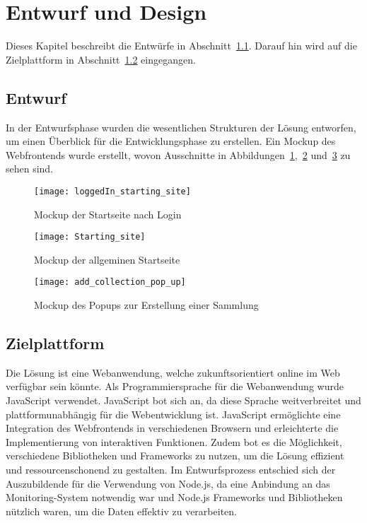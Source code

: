 \section{Entwurf und Design}\label{sec:entwurf-und-design}

Dieses Kapitel beschreibt die Entwürfe in Abschnitt~\ref{subsec:entwurf}.
Darauf hin wird auf die Zielplattform in Abschnitt~\ref{subsec:zielplattform} eingegangen.

\subsection{Entwurf}\label{subsec:entwurf}

In der Entwurfsphase wurden die wesentlichen Strukturen der Lösung entworfen, um einen Überblick für die Entwicklungsphase zu erstellen.
Ein Mockup des Webfrontends wurde erstellt, wovon Ausschnitte in Abbildungen~\ref{fig:mockup1},~\ref{fig:mockup2} und~\ref{fig:mockup3} zu sehen sind.

\begin{figure}[h]
    \centering
    \texttt{[image: loggedIn\_starting\_site]}
    \caption{Mockup der Startseite nach Login}
    \label{fig:mockup1}
\end{figure}

\begin{figure}[h]
    \centering
    \texttt{[image: Starting\_site]}
    \caption{Mockup der allgeminen Startseite}
    \label{fig:mockup2}
\end{figure}

\begin{figure}[h]
    \centering
    \texttt{[image: add\_collection\_pop\_up]}
    \caption{Mockup des Popups zur Erstellung einer Sammlung}
    \label{fig:mockup3}
\end{figure}

\subsection{Zielplattform}\label{subsec:zielplattform}

Die Lösung ist eine Webanwendung, welche zukunftsorientiert online im Web verfügbar sein könnte.
Als Programmiersprache für die Webanwendung wurde JavaScript verwendet.
JavaScript bot sich an, da diese Sprache weitverbreitet und plattformunabhängig für die Webentwicklung ist.
JavaScript ermöglichte eine Integration des Webfrontends in verschiedenen Browsern und erleichterte die Implementierung von interaktiven Funktionen.
Zudem bot es die Möglichkeit, verschiedene Bibliotheken und Frameworks zu nutzen, um die Lösung effizient und ressourcenschonend zu gestalten.
Im Entwurfsprozess entschied sich der Auszubildende für die Verwendung von Node.js, da eine Anbindung an das Monitoring-System notwendig war und Node.js Frameworks und Bibliotheken nützlich waren, um die Daten effektiv zu verarbeiten.

